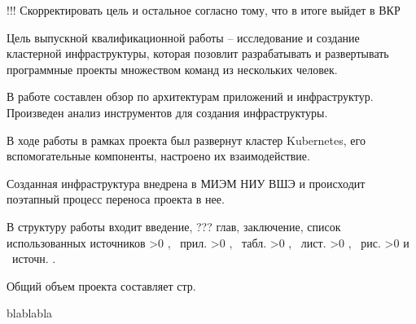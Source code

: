 \Abstract
!!! Скорректировать цель и остальное согласно тому, что в итоге выйдет в ВКР

Цель выпускной квалификационной работы -- исследование и создание кластерной инфраструктуры, которая позовлит разрабатывать и развертывать программные проекты множеством команд из нескольких человек.

В работе составлен обзор по архитектурам приложений и инфраструктур. Произведен анализ инструментов для создания инфраструктуры.

В ходе работы в рамках проекта был развернут кластер Kubernetes, его вспомогательные компоненты, настроено их взаимодействие.

Созданная инфраструктура внедрена в МИЭМ НИУ ВШЭ и происходит поэтапный процесс переноса проекта в нее.

В структуру работы входит введение, ??? глав, заключение, список использованных источников
\ifnum \totapp >0
, \totapp\ прил.
\fi
\ifnum \tottab >0
, \tottab\ табл.
\fi
\ifnum \totlst >0
, \totlst\ лист.
\fi
\ifnum \totfig >0
, \totfig\ рис.
\fi
\ifnum \totbib >0
и \totbib\ источн.
\else
.
\fi

Общий объем проекта составляет \pageref{LastPage} стр.

\AbstractEn

blablabla
